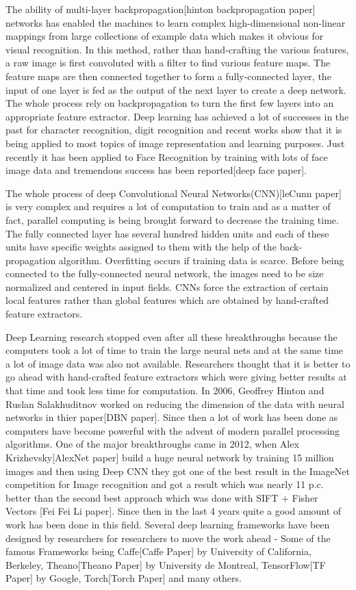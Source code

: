 The ability of multi-layer backpropagation[hinton backpropagation paper] networks has enabled the machines to learn complex high-dimensional non-linear mappings from large collections of example data which makes it obvious for visual recognition. In this method, rather than hand-crafting the various features, a raw image is first convoluted with a filter to find various feature maps. The feature maps are then connected together to form a fully-connected layer, the input of one layer is fed as the output of the next layer to create a deep network. The whole process rely on backpropagation to turn the first few layers into an appropriate feature extractor. Deep learning has achieved a lot of successes in the past for character recognition, digit recognition and recent works show that it is being applied to most topics of image representation and learning purposes. Just recently it has been applied to Face Recognition by training with lots of face image data and tremendous success has been reported[deep face paper].

The whole process of deep Convolutional Neural Networks(CNN)[leCunn paper] is very complex and requires a lot of computation to train and as a matter of fact, parallel computing is being brought forward to decrease the training time. The fully connected layer has several hundred hidden units and each of these units have specific weights assigned to them with the help of the back-propagation algorithm. Overfitting occurs if training data is scarce. Before being connected to the fully-connected neural network, the images need to be size normalized and centered in input fields. CNNs force the extraction of certain local features rather than global features which are obtained by hand-crafted feature extractors.

Deep Learning research stopped even after all these breakthroughs because the computers took a lot of time to train the large neural nets and at the same time a lot of image data was also not available. Researchers thought that it is better to go ahead with hand-crafted feature extractors which were giving better results at that time and took less time for computation. In 2006, Geoffrey Hinton and Ruslan Salakhuditnov worked on reducing the dimension of the data with neural networks in thier paper[DBN paper]. Since then a lot of work has been done as computers have become powerful with the advent of modern parallel processing algorithms. One of the major breakthroughs came in 2012, when Alex Krizhevsky[AlexNet paper] build a huge neural network by training 15 million images and then using Deep CNN they got one of the best result in the ImageNet competition for Image recognition and got a result which  was nearly 11 p.c. better than the second best approach which was done with SIFT + Fisher Vectors [Fei Fei Li paper]. Since then in the last 4 years quite a good amount of work has been done in this field. Several deep learning frameworks have been designed by researchers for researchers to move the work ahead - Some of the famous Frameworks being Caffe[Caffe Paper] by University of California, Berkeley, Theano[Theano Paper] by University de Montreal, TensorFlow[TF Paper] by Google, Torch[Torch Paper] and many others.

